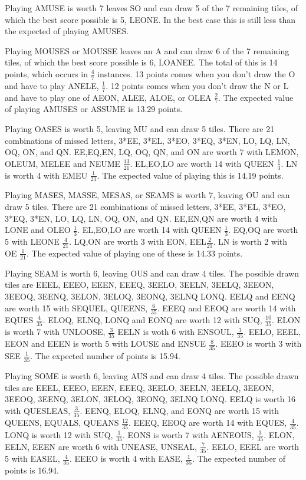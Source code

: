 \documentclass{article}
\begin{document}
Playing AMUSE is worth 7 leaves SO and can draw 5 of the 7 remaining tiles, of which the best score possible is 5, LEONE.  In the best case this is still less than the expected of playing AMUSES.

Playing MOUSES or MOUSSE leaves an A and can draw 6 of the 7 remaining tiles, of which the best score possible is 6, LOANEE.  The total of this is 14 points, which occurs in $\frac{4}{7}$ instances.  13 points comes when you don't draw the O and have to play ANELE, $\frac{1}{7}$. 12 points comes when you don't draw the N or L and have to play one of AEON, ALEE, ALOE, or OLEA $\frac{2}{7}$. The expected value of playing AMUSES or ASSUME is 13.29 points. 

Playing OASES is worth 5, leaving MU and can draw 5 tiles.  There are 21 combinations of missed letters, 3*EE, 3*EL, 3*EO, 3*EQ, 3*EN, LO, LQ, LN, OQ, ON, and QN.  EE,EQ,EN, LQ, OQ, QN, and ON are worth 7 with LEMON, OLEUM, MELEE and NEUME $\frac{13}{21}$. EL,EO,LO are worth 14 with QUEEN $\frac{1}{3}$.  LN is worth 4 with EMEU $\frac{1}{21}$.  The expected value of playing this is 14.19 points.

Playing MASES, MASSE, MESAS, or SEAMS is worth 7, leaving OU and can draw 5 tiles.  There are 21 combinations of missed letters, 3*EE, 3*EL, 3*EO, 3*EQ, 3*EN, LO, LQ, LN, OQ, ON, and QN.  EE,EN,QN are worth 4 with LONE and OLEO $\frac{1}{3}$. EL,EO,LO are worth 14 with QUEEN $\frac{1}{3}$. EQ,OQ are worth 5 with LEONE $\frac{4}{21}$. LQ,ON are worth 3 with EON, EEL$\frac{2}{21}$.  LN is worth 2 with OE $\frac{1}{21}$.  The expected value of playing one of these is 14.33 points.

Playing SEAM is worth 6, leaving OUS and can draw 4 tiles.  The possible drawn tiles are EEEL, EEEO, EEEN, EEEQ, 3EELO, 3EELN, 3EELQ, 3EEON, 3EEOQ, 3EENQ, 3ELON, 3ELOQ, 3EONQ, 3ELNQ LONQ.  EELQ and EENQ are worth 15 with SEQUEL, QUEENS, $\frac{6}{35}$. EEEQ and EEOQ are worth 14 with EQUES $\frac{4}{35}$. ELOQ, ELNQ, LONQ and EONQ are worth 12 with SUQ, $\frac{10}{35}$. ELON is worth 7 with UNLOOSE, $\frac{3}{35}$ EELN is woth 6 with ENSOUL, $\frac{3}{35}$. EELO, EEEL, EEON and EEEN is worth 5 with LOUSE and ENSUE $\frac{8}{35}$. EEEO is worth 3 with SEE $\frac{1}{35}$.  The expected number of points is 15.94. 

Playing SOME is worth 6, leaving AUS and can draw 4 tiles.  The possible drawn tiles are EEEL, EEEO, EEEN, EEEQ, 3EELO, 3EELN, 3EELQ, 3EEON, 3EEOQ, 3EENQ, 3ELON, 3ELOQ, 3EONQ, 3ELNQ LONQ.  EELQ is worth 16 with QUESLEAS, $\frac{3}{35}$. EENQ, ELOQ, ELNQ, and EONQ are worth 15 with QUEENS, EQUALS, QUEANS $\frac{12}{35}$. EEEQ, EEOQ are worth 14 with EQUES, $\frac{4}{35}$. LONQ is worth 12 with SUQ, $\frac{1}{35}$.  EONS is worth 7 with AENEOUS, $\frac{3}{35}$. ELON, EELN, EEEN are worth 6 with UNEASE, UNSEAL, $\frac{7}{35}$. EELO, EEEL are worth 5 with EASEL, $\frac{4}{35}$.  EEEO is worth 4 with EASE, $\frac{1}{35}$.  The expected number of points is 16.94.
\end{document}
